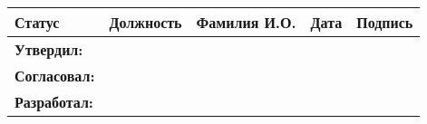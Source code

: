 {{{{{{{{{{%

\vspace{2mm}
\begin{tabu} to \textwidth { |X|X|X|X|X|   }
\hline
\textbf{Статус} & \textbf{Должность} & \textbf{Фамилия И.О.}& \textbf{Дата} & \textbf{Подпись} \\  [1ex] \hline
\textbf{Утвердил:}    & \approverPost{}  & \varApprover{}   & \varDateapprove{}   &  \\  [2ex] \hline
\textbf{Согласовал:}   & \visantPost{}    & \varVisant{}    & \varDatevise{}      &  \\  [2ex] \hline
\textbf{Разработал:}   & \initiatorPost{} & \varInitiator{} & \varDatecreation{}  &  \\  [2ex] \hline
\end{tabu}

\pagebreak

\pagestyle{firstpage}

\vspace{1cm}

\tableofcontents

\vfill


\pagebreak



\pagestyle{maintext}

}}}}}}}}}}
